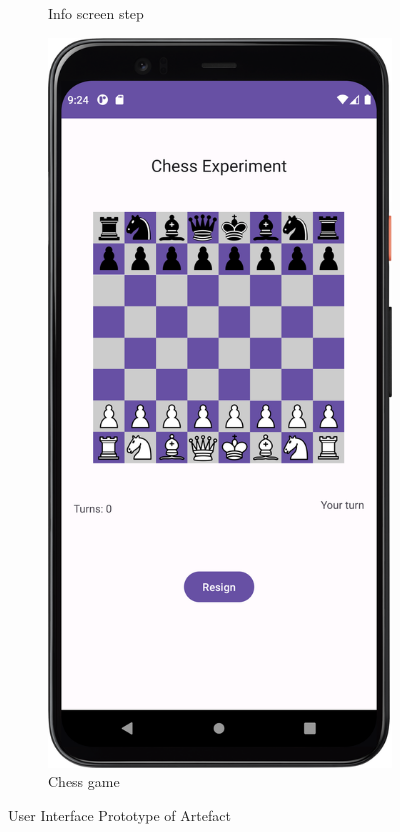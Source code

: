 \begin{figure}[htbp]
\begin{subfigure}[b]{0.25\textwidth}
        \caption{Info screen step}
        \label{subfig:InfoScreen2}
    \end{subfigure}
    \hspace{1cm}
    \begin{subfigure}[b]{0.25\textwidth}
        \centering
        \includegraphics[width=\textwidth]{content/06_demonstration_of_the_artifact/Screenshot_Chess.png}
        \caption{Chess game}
        \label{subfig:ChessGame}
    \end{subfigure}
    \caption{User Interface Prototype of Artefact}
    \label{fig:uiScreens}
\end{figure}

